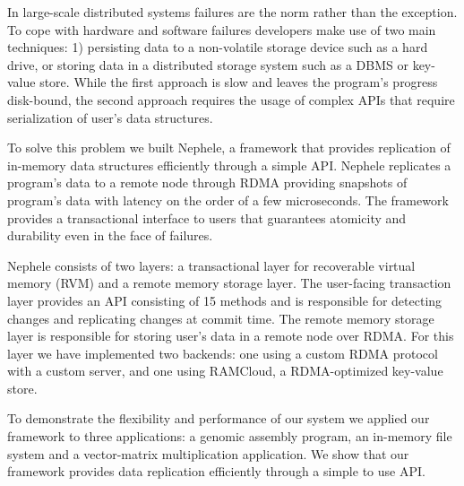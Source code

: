 In large-scale distributed systems failures are the norm rather than the exception. 
To cope with hardware and software failures developers make use of two main techniques: 1) persisting data to a non-volatile storage device such as a hard drive, or storing data in a distributed storage system such as a DBMS or key-value store. 
While the first approach is slow and leaves the program's progress disk-bound, the second approach requires the usage of complex APIs that require serialization of user's data structures.

To solve this problem we built Nephele, a framework that provides replication of in-memory data structures efficiently through a simple API. 
Nephele replicates a program's data to a remote node through RDMA providing snapshots of program's data with latency on the order of a few microseconds.
The framework provides a transactional interface to users that guarantees atomicity and durability even in the face of failures.

Nephele consists of two layers: a transactional layer for recoverable virtual memory (RVM) and a remote memory storage layer. The user-facing transaction layer provides an API consisting of 15 methods and is responsible for detecting changes and replicating changes at commit time. The remote memory storage layer is responsible for storing user's data in a remote node over RDMA. For this layer we have implemented two backends: one using a custom RDMA protocol with a custom server, and one using RAMCloud, a RDMA-optimized key-value store.

To demonstrate the flexibility and performance of our system we applied our framework to three applications: a genomic assembly program, an in-memory file system and a vector-matrix multiplication application.
We show that our framework provides data replication efficiently through a simple to use API.

